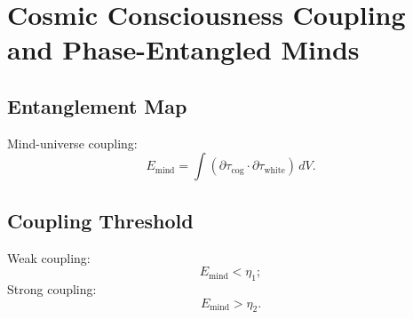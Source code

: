 \chapter{Cosmic Consciousness Coupling and Phase-Entangled Minds}

\section{Entanglement Map}
Mind-universe coupling:
\[
E_{\mathrm{mind}} = \int (\partial\tau_{\mathrm{cog}} \cdot \partial\tau_{\mathrm{white}})\, dV.
\]

\section{Coupling Threshold}
Weak coupling:
\[
E_{\mathrm{mind}} < \eta_1;
\]
Strong coupling:
\[
E_{\mathrm{mind}} > \eta_2.
\]

